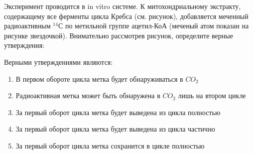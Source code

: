 
Эксперимент проводится в in vitro системе. К митохондриальному экстракту, содержащему все ферменты цикла
Кребса (см. рисунок),  добавляется
меченный радиоактивным $^{14}$С по метильной группе ацетил-КоА (меченый
атом показан на рисунке звездочкой). Внимательно рассмотрев рисунок, определите верные утверждения:


Верными утверждениями являются:

\begin{enumerate}
    \item В первом обороте цикла метка будет обнаруживаться в $CO_2$
    \item Радиоактивная метка может быть обнаружена в $CO_2$ лишь на втором цикле
    \item За первый оборот цикла метка будет выведена из цикла полностью
    \item За первый оборот цикла метка будет выведена из цикла частично
    \item За первый оборот цикла метка сохранится в цикле полностью
\end{enumerate}



